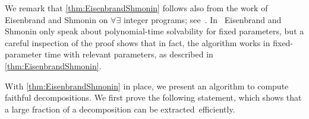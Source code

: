 \documentclass{article}
\begin{document}
We remark that \cref{thm:EisenbrandShmonin} follows also from the work of Eisenbrand and Shmonin on $\forall\exists$ integer programs; see~\cite[Theorem~4.2]{DBLP:journals/mor/EisenbrandS08}. In~\cite{DBLP:journals/mor/EisenbrandS08} Eisenbrand and Shmonin only speak about polynomial-time solvability for fixed parameters, but a careful inspection of the proof shows that in fact, the algorithm works in fixed-parameter time with relevant parameters, as described in \cref{thm:EisenbrandShmonin}.


With \cref{thm:EisenbrandShmonin} in place, we present an algorithm to compute faithful decompositions. We first prove the following statement, which shows that a large fraction of a decomposition can be extracted~efficiently.
\end{document}
